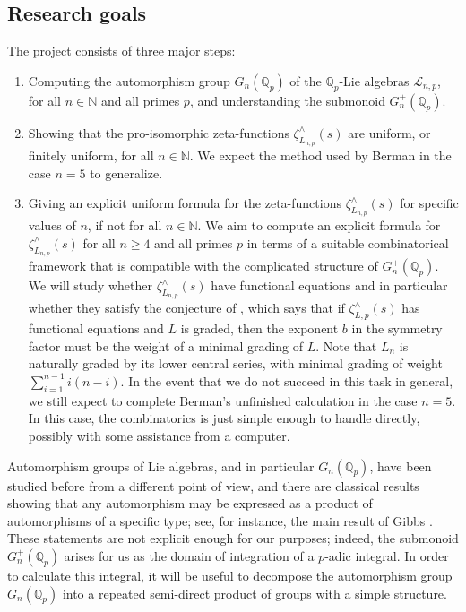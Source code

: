 \documentclass[12pt]{article}
\begin{document}
\subsection{Research goals}
The project consists of three major steps:
\begin{enumerate}
\item
Computing the automorphism group $G_{n}(\mathbb{Q}_{p})$ of the $\mathbb{Q}_p$-Lie algebras $\mathcal{L}_{n,p}$, for all $n\in\mathbb{N}$ and all primes $p$, and understanding the submonoid $G_{n}^{+}(\mathbb{Q}_{p})$.
\item
Showing that the pro-isomorphic zeta-functions $\zeta_{L_{n,p}}^{\wedge}(s)$ are uniform, or finitely uniform, for all $n\in\mathbb{N}$. We expect the method used by Berman in the case $n=5$ to generalize.
\item
Giving an explicit uniform formula for the zeta-functions $\zeta_{L_{n,p}}^{\wedge}(s)$ for specific values of $n$, if not for all $n\in\mathbb{N}$.
We aim to compute an explicit formula for $\zeta_{L_{n,p}}^{\wedge}(s)$ for all $n \geq 4$ and all primes $p$ in terms of a suitable combinatorical framework that is compatible with the complicated structure of $G_{n}^{+}(\mathbb{Q}_p)$. We will study whether $\zeta_{L_{n,p}}^{\wedge}(s)$ have functional equations and in particular whether they satisfy the conjecture of \cite{BermanKlopschOnn}, which says that if $\zeta_{L,p}^{\wedge}(s)$ has functional equations and $L$ is graded, then the exponent $b$ in the symmetry factor must be the weight of a minimal grading of $L$. Note that $L_{n}$ is naturally graded by its lower central series, with minimal grading of weight $\sum_{i=1}^{n-1}{i(n-i)}$. In the event that we do not succeed in this task in general, we still expect to complete Berman's unfinished calculation in the case $n=5$. In this case, the combinatorics is just simple enough to handle directly, possibly with some assistance from a computer.
\end{enumerate}

Automorphism groups of Lie algebras, and in particular $G_{n}(\mathbb{Q}_{p})$, have been studied before from a different point of view, and there are classical results showing that any automorphism may be expressed as a product of automorphisms of a specific type; see, for instance, the main result of Gibbs \cite{Gibbs}.  These statements are not explicit enough for our purposes; indeed, the submonoid $G_{n}^{+}(\mathbb{Q}_p)$ arises for us as the domain of integration of a $p$-adic integral.  In order to calculate this integral, it will be useful to decompose the automorphism group $G_{n}(\mathbb{Q}_p)$ into a repeated semi-direct product of groups with a simple structure.
\end{document}
